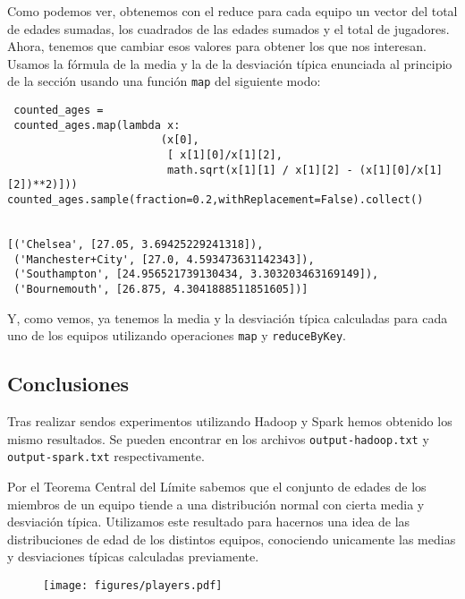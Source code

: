 \documentclass[11pt]{article}
\def\inline{\lstinline[basicstyle=\ttfamily,keywordstyle={}]}
\begin{document}
Como podemos ver, obtenemos con el reduce para cada equipo un vector del total de edades sumadas, los cuadrados de las edades sumados y el total de jugadores. Ahora, tenemos que cambiar esos valores para obtener los que nos interesan. Usamos la fórmula de la media y la de la desviación típica enunciada al principio de la sección usando una función \inline{map} del siguiente modo:

\begin{verbatim}
 counted_ages =
 counted_ages.map(lambda x:
                        (x[0],
                         [ x[1][0]/x[1][2],
                         math.sqrt(x[1][1] / x[1][2] - (x[1][0]/x[1][2])**2)]))
counted_ages.sample(fraction=0.2,withReplacement=False).collect()


[('Chelsea', [27.05, 3.69425229241318]),
 ('Manchester+City', [27.0, 4.593473631142343]),
 ('Southampton', [24.956521739130434, 3.303203463169149]),
 ('Bournemouth', [26.875, 4.3041888511851605])]
\end{verbatim}

Y, como vemos, ya tenemos la media y la desviación típica calculadas para cada uno de los equipos utilizando operaciones \inline{map} y \inline{reduceByKey}.

\subsection{Conclusiones}

Tras realizar sendos experimentos utilizando Hadoop y Spark hemos obtenido los mismo resultados. Se pueden encontrar en los archivos \inline{output-hadoop.txt} y \inline{output-spark.txt} respectivamente.

Por el Teorema Central del Límite sabemos que el conjunto de edades de los miembros de un equipo tiende a una distribución normal con cierta media y desviación típica. Utilizamos este resultado para hacernos una idea de las distribuciones de edad de los distintos equipos, conociendo unicamente las medias y desviaciones típicas calculadas previamente.

\begin{figure}[H]
	\centering
	\texttt{[image: figures/players.pdf]}
	\caption{}
\end{figure}
\end{document}

